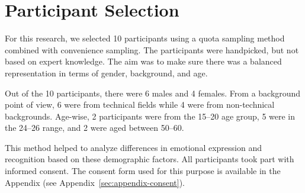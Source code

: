 \section{Participant Selection}
\label{sec:participant-selection}
For this research, we selected 10 participants using a quota sampling method combined with convenience sampling. The participants were handpicked, but not based on expert knowledge. The aim was to make sure there was a balanced representation in terms of gender, background, and age.

Out of the 10 participants, there were 6 males and 4 females. From a background point of view, 6 were from technical fields while 4 were from non-technical backgrounds. Age-wise, 2 participants were from the 15–20 age group, 5 were in the 24–26 range, and 2 were aged between 50–60.

This method helped to analyze differences in emotional expression and recognition based on these demographic factors. All participants took part with informed consent. The consent form used for this purpose is available in the Appendix (see Appendix~\ref{sec:appendix-consent}).
